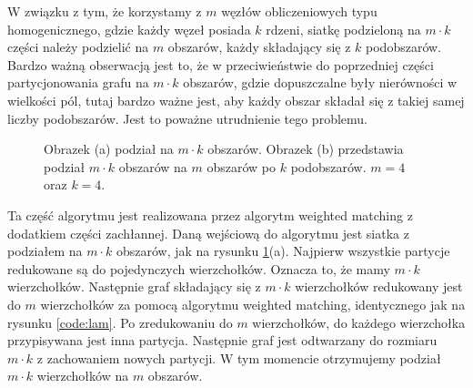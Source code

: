 W związku z tym, że korzystamy z $m$ węzłów obliczeniowych typu homogenicznego, gdzie każdy węzeł posiada $k$ rdzeni,
siatkę podzieloną na $m \cdot k$ części należy podzielić na $m$ obszarów, każdy składający się
z $k$ podobszarów.
Bardzo ważną obserwacją jest to, że w przeciwieństwie do poprzedniej części partycjonowania grafu na $m \cdot k$ obszarów,
gdzie dopuszczalne były nierówności w wielkości pól, tutaj bardzo ważne jest, aby każdy obszar składał
się z takiej samej liczby podobszarów.
Jest to poważne utrudnienie tego problemu.

\begin{figure}[h]
\centering
\begin{subfigure}{.5\textwidth}
    \centering
    \caption[short]{}
\end{subfigure}%
\begin{subfigure}{.5\textwidth}
    \centering
    \caption[short]{}
\end{subfigure}
\caption{Obrazek (a) podział na $m \cdot k$ obszarów. Obrazek (b) przedstawia podział $m \cdot k$ obszarów na $m$ obszarów
po $k$ podobszarów. $m=4$ oraz $k=4$.}
\label{im:k_m}
\end{figure}

Ta część algorytmu jest realizowana przez algorytm weighted matching z dodatkiem części zachłannej.
Daną wejściową do algorytmu jest siatka z podziałem na $m \cdot k$ obszarów, jak na rysunku \ref{im:k_m}(a).
Najpierw wszystkie partycje redukowane są do pojedynczych wierzchołków.
Oznacza to, że mamy $m \cdot k$ wierzchołków.
Następnie graf składający się z $m \cdot k$ wierzchołków redukowany jest do $m$ wierzchołków
za pomocą algorytmu weighted matching, identycznego jak na rysunku \ref{code:lam}.
Po zredukowaniu do $m$ wierzchołków, do każdego wierzchołka przypisywana jest inna partycja.
Następnie graf jest odtwarzany do rozmiaru $m \cdot k$ z zachowaniem nowych partycji.
W tym momencie otrzymujemy podział $m \cdot k$ wierzchołków na $m$ obszarów.

